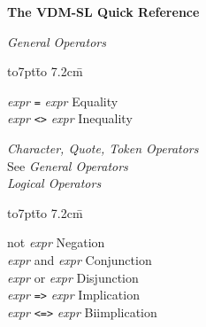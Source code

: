 \documentclass[a4paper]{jsarticle}
\newcommand{\keyw}[1]{{\sf #1}}
\newcommand{\K}[1]{{\sf #1}}
\newcommand{\id}[1]{{\it #1\/}}
\newenvironment{tabbingone}[0]{
\begingroup
  \parskip=0pt
  \topsep=0pt
  \partopsep=0pt
  \begin{tabbing}
    \hbox to7pt{}\=%
    \hbox to 7.2cm{}\=%
    \kill
    \+ %
    \kill
}{
  \end{tabbing}
\endgroup}
\begin{document}

\pagestyle{empty}


{\Large\bf The VDM-SL Quick Reference}

\id{General Operators}
\begin{tabbingone}
  \id{expr} {\tt=} \id{expr} \> Equality   \\ %
  \id{expr} {\tt<>} \id{expr}\> Inequality \\ %
\end{tabbingone}

\id{Character, Quote, Token Operators}
\\
See \id{General Operators} \\
  
\id{Logical Operators} 
\begin{tabbingone}

  \K{not} \id{expr}\> Negation   \\ %
  \id{expr} \K{and} \id{expr}\> Conjunction\\ %
  \id{expr} \K{or} \id{expr}\> Disjunction\\ %
  \id{expr} {\tt=>} \id{expr}\> Implication \\ %
  \id{expr} {\tt<=>} \id{expr}\> Biimplication \\ %
  
\end{tabbingone}
\end{document}
